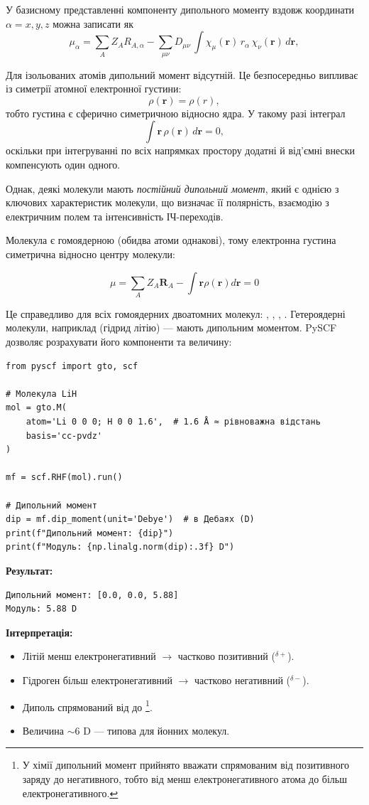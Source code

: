 У базисному представленні компоненту дипольного моменту
вздовж координати~$\alpha = x, y, z$ можна записати як
\begin{equation}
	\mu_\alpha = \sum_A Z_A R_{A,\alpha}
	- \sum_{\mu\nu} D_{\mu\nu}\, \int \chi_\mu(\mathbf{r})\, r_\alpha\, \chi_\nu(\mathbf{r})\, d\mathbf{r},
	\label{eq:dipole}
\end{equation}

Для ізольованих атомів дипольний момент відсутній.
Це безпосередньо випливає із симетрії атомної електронної густини:
\[
	\rho(\mathbf{r}) = \rho(r),
\]
тобто густина є сферично симетричною відносно ядра.
У такому разі інтеграл
\[
	\int \mathbf{r}\,\rho(\mathbf{r})\,d\mathbf{r} = 0,
\]
оскільки при інтегруванні по всіх напрямках простору
додатні й від’ємні внески компенсують один одного.

Однак, деякі молекули мають \emph{постійний дипольний момент}, який є
однією з ключових характеристик молекули, що визначає її полярність,
взаємодію з електричним полем та інтенсивність ІЧ-переходів.

Молекула  є гомоядерною (обидва атоми однакові), тому електронна густина симетрична відносно центру молекули:

\begin{equation*}
	\mu = \sum_A Z_A \mathbf{R}_A - \int \mathbf{r} \rho(\mathbf{r}) d\mathbf{r} = 0
\end{equation*}

Це справедливо для всіх гомоядерних двоатомних молекул: , , , . Гетероядерні молекули, наприклад  (гідрид літію) --- мають дипольним моментом. PySCF дозволяє розрахувати його компоненти та величину:

\begin{verbatim}
from pyscf import gto, scf

# Молекула LiH
mol = gto.M(
    atom='Li 0 0 0; H 0 0 1.6',  # 1.6 Å ≈ рівноважна відстань
    basis='cc-pvdz'
)

mf = scf.RHF(mol).run()

# Дипольний момент
dip = mf.dip_moment(unit='Debye')  # в Дебаях (D)
print(f"Дипольний момент: {dip}")
print(f"Модуль: {np.linalg.norm(dip):.3f} D")
\end{verbatim}

\textbf{Результат:}
\begin{verbatim}
Дипольний момент: [0.0, 0.0, 5.88]
Модуль: 5.88 D
\end{verbatim}

\textbf{Інтерпретація:}
\begin{itemize}
	\item Літій менш електронегативний $\rightarrow$ частково позитивний ($^{\delta+}$).
	\item Гідроген більш електронегативний $\rightarrow$ частково негативний ($^{\delta-}$).
	\item Диполь спрямований від  до \footnote{У хімії дипольний момент прийнято вважати спрямованим від позитивного заряду до негативного, тобто від менш електронегативного атома до більш електронегативного.}.
	\item Величина $\sim 6$ D --- типова для йонних молекул.
\end{itemize}

